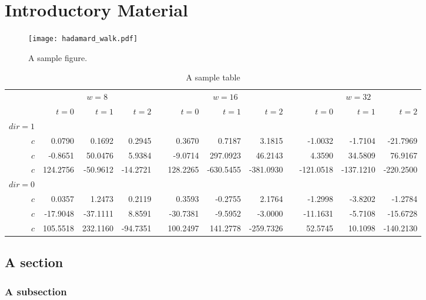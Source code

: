 

\chapter{Introductory Material}
\label{chapterlabel1}


\begin{figure}[H]
\centering
\texttt{[image: hadamard\_walk.pdf]}
\caption{A sample figure.}
\end{figure}

\newcommand{\ra}[1]{\renewcommand{\arraystretch}{#1}}
\begin{landscape}
	\begin{table*}\centering
	\ra{1.3}
	\begin{tabular}{@{}rrrrcrrrcrrr@{}}\toprule
	& \multicolumn{3}{c}{$w = 8$} & \phantom{abc}& \multicolumn{3}{c}{$w = 16$} &
	\phantom{abc} & \multicolumn{3}{c}{$w = 32$}\\ \cmidrule{2-4} \cmidrule{6-8} \cmidrule{10-12}
	& $t=0$ & $t=1$ & $t=2$ && $t=0$ & $t=1$ & $t=2$ && $t=0$ & $t=1$ & $t=2$\\ \midrule
	$dir=1$\\
	$c$ & 0.0790 & 0.1692 & 0.2945 && 0.3670 & 0.7187 & 3.1815 && -1.0032 & -1.7104 & -21.7969\\
	$c$ & -0.8651& 50.0476& 5.9384&& -9.0714& 297.0923& 46.2143&& 4.3590& 34.5809& 76.9167\\
	$c$ & 124.2756& -50.9612& -14.2721&& 128.2265& -630.5455& -381.0930&& -121.0518& -137.1210& -220.2500\\ $dir=0$\\
	$c$ & 0.0357& 1.2473& 0.2119&& 0.3593& -0.2755& 2.1764&& -1.2998& -3.8202& -1.2784\\
	$c$ & -17.9048& -37.1111& 8.8591&& -30.7381& -9.5952& -3.0000&& -11.1631& -5.7108& -15.6728\\
	$c$ & 105.5518& 232.1160& -94.7351&& 100.2497& 141.2778& -259.7326&& 52.5745& 10.1098& -140.2130\\ \bottomrule
	\end{tabular}
	\caption{A sample table}
	\end{table*}
\end{landscape}


\nocite{*}

\section{A section}
\subsection{A subsection}